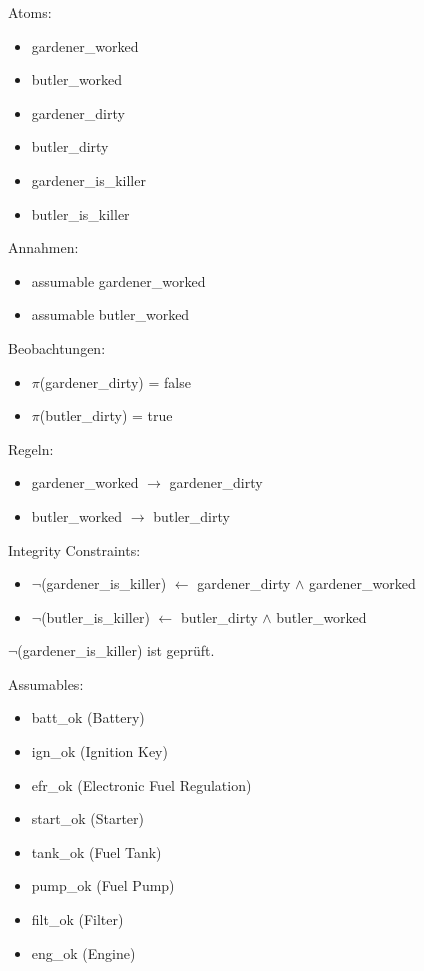 \documentclass[ngerman]{fbi-aufgabenblatt}
\begin{document}

Atoms: 
\begin{itemize}
\item gardener\_worked
\item butler\_worked
\item gardener\_dirty
\item butler\_dirty
\item gardener\_is\_killer
\item butler\_is\_killer \\
\end{itemize}

Annahmen:
\begin{itemize}
\item assumable gardener\_worked
\item assumable butler\_worked \\
\end{itemize}

Beobachtungen:
\begin{itemize}
\item \(\pi\)(gardener\_dirty) = false
\item \(\pi\)(butler\_dirty) = true \\
\end{itemize}

Regeln:
\begin{itemize}
\item gardener\_worked \(\rightarrow\) gardener\_dirty
\item butler\_worked \(\rightarrow\) butler\_dirty \\
\end{itemize}

Integrity Constraints:
\begin{itemize}
\item \(\neg\)(gardener\_is\_killer) \(\leftarrow\) gardener\_dirty \(\land\) gardener\_worked
\item \(\neg\)(butler\_is\_killer) \(\leftarrow\) butler\_dirty \(\land\) butler\_worked
\end{itemize}

\(\neg\)(gardener\_is\_killer) ist geprüft.

\newpage


Assumables:
\begin{itemize}
\item batt\_ok (Battery)
\item ign\_ok (Ignition Key)
\item efr\_ok (Electronic Fuel Regulation)
\item start\_ok (Starter)
\item tank\_ok (Fuel Tank)
\item pump\_ok (Fuel Pump)
\item filt\_ok (Filter)
\item eng\_ok (Engine) \\ 
\end{itemize}
\end{document}
